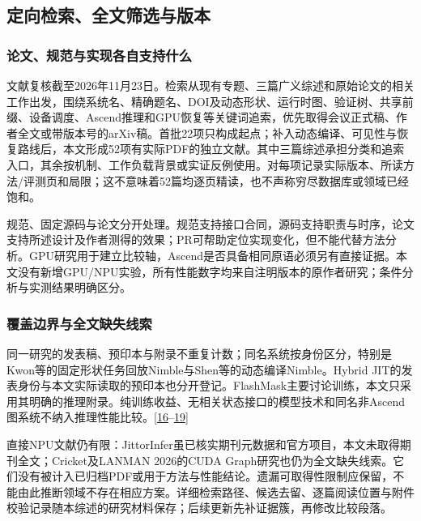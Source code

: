 \documentclass[
  UTF8,
  zihao=5]{ctexart}
\begin{document}
\hypertarget{ux5b9aux5411ux68c0ux7d22ux5168ux6587ux7b5bux9009ux4e0eux7248ux672c}{%
\subsection{定向检索、全文筛选与版本}\label{ux5b9aux5411ux68c0ux7d22ux5168ux6587ux7b5bux9009ux4e0eux7248ux672c}}

\hypertarget{ux8bbaux6587ux89c4ux8303ux4e0eux5b9eux73b0ux5404ux81eaux652fux6301ux4ec0ux4e48}{%
\subsubsection{论文、规范与实现各自支持什么}\label{ux8bbaux6587ux89c4ux8303ux4e0eux5b9eux73b0ux5404ux81eaux652fux6301ux4ec0ux4e48}}

文献复核截至2026年11月23日。检索从现有专题、三篇广义综述和原始论文的相关工作出发，围绕系统名、精确题名、DOI及动态形状、运行时图、验证树、共享前缀、设备调度、Ascend推理和GPU恢复等关键词追索，优先取得会议正式稿、作者全文或带版本号的arXiv稿。首批22项只构成起点；补入动态编译、可见性与恢复路线后，本文形成52项有实际PDF的独立文献。其中三篇综述承担分类和追索入口，其余按机制、工作负载背景或实证反例使用。对每项记录实际版本、所读方法/评测页和局限；这不意味着52篇均逐页精读，也不声称穷尽数据库或领域已经饱和。

规范、固定源码与论文分开处理。规范支持接口合同，源码支持职责与时序，论文支持所述设计及作者测得的效果；PR可帮助定位实现变化，但不能代替方法分析。GPU研究用于建立比较轴，Ascend是否具备相同原语必须另有直接证据。本文没有新增GPU/NPU实验，所有性能数字均来自注明版本的原作者研究；条件分析与实测结果明确区分。

\hypertarget{ux8986ux76d6ux8fb9ux754cux4e0eux5168ux6587ux7f3aux5931ux7ebfux7d22}{%
\subsubsection{覆盖边界与全文缺失线索}\label{ux8986ux76d6ux8fb9ux754cux4e0eux5168ux6587ux7f3aux5931ux7ebfux7d22}}

同一研究的发表稿、预印本与附录不重复计数；同名系统按身份区分，特别是Kwon等的固定形状任务回放Nimble与Shen等的动态编译Nimble。Hybrid
JIT的发表身份与本文实际读取的预印本也分开登记。FlashMask主要讨论训练，本文只采用其明确的推理附录。纯训练收益、无相关状态接口的模型技术和同名非Ascend图系统不纳入推理性能比较。{[}\protect\hyperlink{ref-kwon2020nimble}{16}--\protect\hyperlink{ref-wang2025flashmask}{19}{]}

直接NPU文献仍有限：JittorInfer虽已核实期刊元数据和官方项目，本文未取得期刊全文；Cricket及LANMAN
2026的CUDA
Graph研究也仍为全文缺失线索。它们没有被计入已归档PDF或用于方法与性能结论。遗漏可取得性限制应保留，不能由此推断领域不存在相应方案。详细检索路径、候选去留、逐篇阅读位置与附件校验记录随本综述的研究材料保存；后续更新先补证据簇，再修改比较段落。
\end{document}
